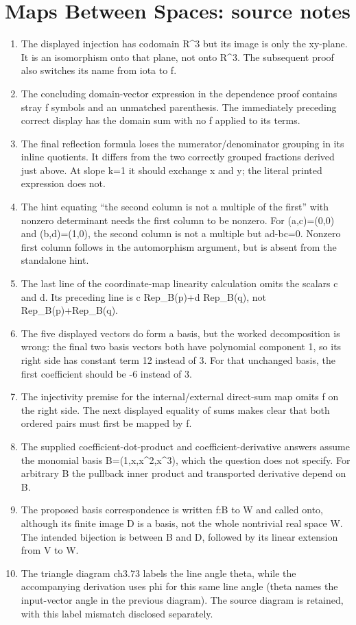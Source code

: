 \section*{Maps Between Spaces: source notes}
\begin{enumerate}
\item The displayed injection has codomain R\textasciicircum{}3 but its image is only the xy-plane. It is an isomorphism onto that plane, not onto R\textasciicircum{}3. The subsequent proof also switches its name from iota to f.
\item The concluding domain-vector expression in the dependence proof contains stray f symbols and an unmatched parenthesis. The immediately preceding correct display has the domain sum with no f applied to its terms.
\item The final reflection formula loses the numerator/denominator grouping in its inline quotients. It differs from the two correctly grouped fractions derived just above. At slope k=1 it should exchange x and y; the literal printed expression does not.
\item The hint equating “the second column is not a multiple of the first” with nonzero determinant needs the first column to be nonzero. For (a,c)=(0,0) and (b,d)=(1,0), the second column is not a multiple but ad-bc=0. Nonzero first column follows in the automorphism argument, but is absent from the standalone hint.
\item The last line of the coordinate-map linearity calculation omits the scalars c and d. Its preceding line is c Rep\_B(p)+d Rep\_B(q), not Rep\_B(p)+Rep\_B(q).
\item The five displayed vectors do form a basis, but the worked decomposition is wrong: the final two basis vectors both have polynomial component 1, so its right side has constant term 12 instead of 3. For that unchanged basis, the first coefficient should be -6 instead of 3.
\item The injectivity premise for the internal/external direct-sum map omits f on the right side. The next displayed equality of sums makes clear that both ordered pairs must first be mapped by f.
\item The supplied coefficient-dot-product and coefficient-derivative answers assume the monomial basis B=(1,x,x\textasciicircum{}2,x\textasciicircum{}3), which the question does not specify. For arbitrary B the pullback inner product and transported derivative depend on B.
\item The proposed basis correspondence is written f:B to W and called onto, although its finite image D is a basis, not the whole nontrivial real space W. The intended bijection is between B and D, followed by its linear extension from V to W.
\item The triangle diagram ch3.73 labels the line angle theta, while the accompanying derivation uses phi for this same line angle (theta names the input-vector angle in the previous diagram). The source diagram is retained, with this label mismatch disclosed separately.
\end{enumerate}
